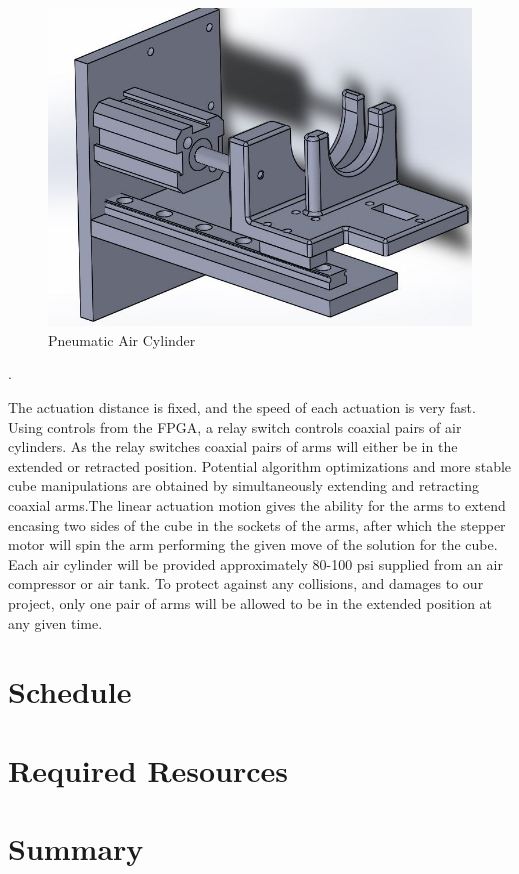 \documentclass[11pt,english]{article}
\begin{document}
\begin{figure}[!ht]
\centering
\includegraphics[scale=0.5]{AirCylinder.jpg}
\caption{Pneumatic Air Cylinder}
\label{fig:Pneumatic Air Cylinder}
\end{figure}. 

The actuation distance is fixed, and the speed of each actuation is very fast.
Using controls from the FPGA, a relay switch controls coaxial pairs of air
cylinders.  As the relay switches coaxial pairs of arms will either be in the
extended or retracted position. Potential algorithm optimizations and more
stable cube manipulations  are obtained by simultaneously extending and
retracting coaxial arms.The linear actuation motion gives the ability for the
arms to extend encasing two sides of the cube in the sockets of the arms, after
which the stepper motor will spin the arm performing the given move of the
solution for the cube. Each air cylinder will be provided approximately
80-100 psi supplied from an air compressor or air tank. To protect against any
collisions, and damages to our project, only one pair of arms will be allowed
to be in the extended position at any given time.


\section{Schedule}
\section{Required Resources}
\section{Summary}
\end{document}
